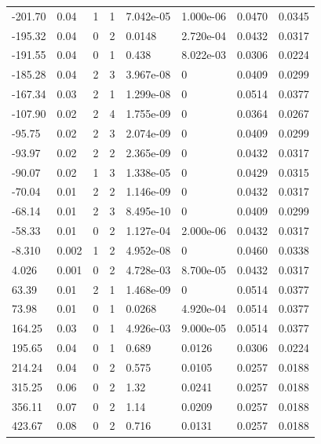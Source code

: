 \documentclass[preview]{standalone}
\begin{document}
{{\begin{tabular}{L{1.2cm}C{1.2cm} C{0.3cm}C{0.5cm} C{1.4cm}C{1.4cm} C{1.4cm}C{1.4cm}}
  -201.70  &  0.04  & 1     &  1 &  7.042e-05  & 1.000e-06  & 0.0470 &  0.0345   \\ 
  -195.32  &  0.04  & 0     &  2 &  0.0148  & 2.720e-04  & 0.0432 &  0.0317   \\ 
  -191.55  &  0.04  & 0     &  1 &  0.438  & 8.022e-03  & 0.0306 &  0.0224   \\ 
  -185.28  &  0.04  & 2     &  3 &  3.967e-08  & 0  & 0.0409 &  0.0299   \\ 
  -167.34  &  0.03  & 2     &  1 &  1.299e-08  & 0  & 0.0514 &  0.0377   \\ 
  -107.90  &  0.02  & 2     &  4 &  1.755e-09  & 0  & 0.0364 &  0.0267   \\ 
  -95.75  &  0.02  & 2     &  3 &  2.074e-09  & 0  & 0.0409 &  0.0299   \\ 
  -93.97  &  0.02  & 2     &  2 &  2.365e-09  & 0  & 0.0432 &  0.0317   \\ 
  -90.07  &  0.02  & 1     &  3 &  1.338e-05  & 0  & 0.0429 &  0.0315   \\ 
  -70.04  &  0.01  & 2     &  2 &  1.146e-09  & 0  & 0.0432 &  0.0317   \\ 
  -68.14  &  0.01  & 2     &  3 &  8.495e-10  & 0  & 0.0409 &  0.0299   \\ 
  -58.33  &  0.01  & 0     &  2 &  1.127e-04  & 2.000e-06  & 0.0432 &  0.0317   \\ 
  -8.310  &  0.002  & 1     &  2 &  4.952e-08  & 0  & 0.0460 &  0.0338   \\ 
  4.026  &  0.001  & 0     &  2 &  4.728e-03  & 8.700e-05  & 0.0432 &  0.0317   \\ 
  63.39  &  0.01  & 2     &  1 &  1.468e-09  & 0  & 0.0514 &  0.0377   \\ 
  73.98  &  0.01  & 0     &  1 &  0.0268  & 4.920e-04  & 0.0514 &  0.0377   \\ 
  164.25  &  0.03  & 0     &  1 &  4.926e-03  & 9.000e-05  & 0.0514 &  0.0377   \\ 
  195.65  &  0.04  & 0     &  1 &  0.689  & 0.0126  & 0.0306 &  0.0224   \\ 
  214.24  &  0.04  & 0     &  2 &  0.575  & 0.0105  & 0.0257 &  0.0188   \\ 
  315.25  &  0.06  & 0     &  2 &  1.32  & 0.0241  & 0.0257 &  0.0188   \\ 
  356.11  &  0.07  & 0     &  2 &  1.14  & 0.0209  & 0.0257 &  0.0188   \\ 
  423.67  &  0.08  & 0     &  2 &  0.716  & 0.0131  & 0.0257 &  0.0188   \\ 

\end{tabular}}}
\end{document}
